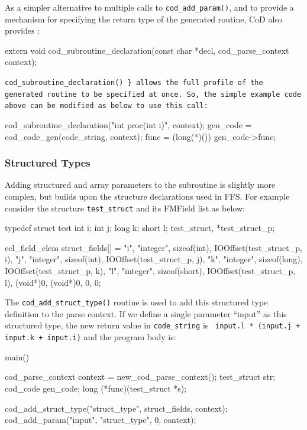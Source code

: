 As a simpler alternative to multiple calls to {\tt cod\_add\_param()},
and to provide a mechanism for specifying the return type of the
generated routine, CoD also provides :
\begin{Code}
extern void
cod_subroutine_declaration(const char *decl, cod_parse_context context);
\end{Code}
{\tt cod\_subroutine\_declaration() \} allows the full profile of the
  generated routine to be specified at once.  So, the simple example
  code above can be modified as below to use this call:
\begin{Code}
    cod_subroutine_declaration("int proc(int i)", context);
    gen_code = cod_code_gen(code_string, context);
    func = (long(*)()) gen_code->func;
\end{Code}


\subsubsection{Structured Types}

Adding structured and array parameters to the subroutine is slightly more
complex, but builds upon the structure declarations used in FFS.  For
example consider the structure {\tt test\_struct} and its FMField list
as below:
\begin{Code}
typedef struct test {
    int i;
    int j;
    long k;
    short l;
} test_struct, *test_struct_p;

ecl_field_elem struct_fields[] = {
    {"i", "integer", sizeof(int), IOOffset(test_struct_p, i)},
    {"j", "integer", sizeof(int), IOOffset(test_struct_p, j)},
    {"k", "integer", sizeof(long), IOOffset(test_struct_p, k)},
    {"l", "integer", sizeof(short), IOOffset(test_struct_p, l)},
    {(void*)0, (void*)0, 0, 0}};
\end{Code}

The {\tt cod\_add\_struct\_type()} routine is used to add this structured type
definition to the parse context.  If we define a single parameter ``input'' as
this structured type, the new return value in {\tt code\_string} is {\tt
input.l * (input.j + input.k + input.i)} and the program body is:
\begin{Code}
main() {
    cod_parse_context context = new_cod_parse_context();
    test_struct str;
    cod_code gen_code;
    long (*func)(test_struct *s);

    cod_add_struct_type("struct_type", struct_fields, context);
    cod_add_param("input", "struct_type", 0, context);

}
\end{Code}}
